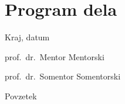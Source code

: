 \documentclass[11pt,a4paper,twoside,slovene]{book}
\begin{document}

\cleardoublepage

\pagestyle{fancyplain}

{
\renewcommand{\markboth}[2]{}
\tableofcontents
}

\cleardoublepage


%


\chapter*{Program dela}


\bigskip

\begin{flushleft}
  Kraj, datum %
\end{flushleft}

\bigskip

\begin{flushright}
  prof.\ dr.\ Mentor Mentorski %
  \quad 
\end{flushright}

\vspace{1cm}
\begin{flushright}
  prof.\ dr.\ Somentor Somentorski %
  \quad
\end{flushright}

\cleardoublepage
{}
{}

\thispagestyle{empty}
\begin{center}
{\Large \sc Povzetek}
\end{center}
\end{document}
